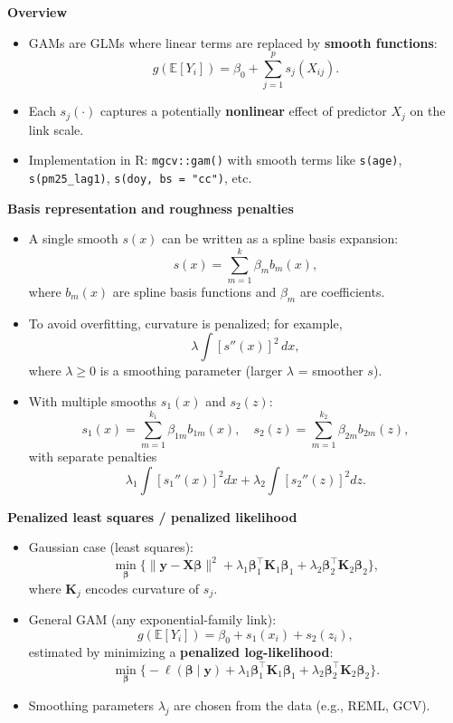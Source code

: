 \documentclass[
  letterpaper,
  DIV=11,
  numbers=noendperiod]{scrreprt}
\providecommand{\tightlist}{%
  \setlength{\itemsep}{0pt}\setlength{\parskip}{0pt}}\usepackage{longtable,booktabs,array}
\begin{document}
\textbf{Overview}

\begin{itemize}
\tightlist
\item
  GAMs are GLMs where linear terms are replaced by \textbf{smooth
  functions}: \[
  g(\mathbb{E}[Y_i]) = \beta_0 + \sum_{j=1}^p s_j(X_{ij}).
  \]
\item
  Each \(s_j(\cdot)\) captures a potentially \textbf{nonlinear} effect
  of predictor \(X_j\) on the link scale.
\item
  Implementation in R: \texttt{mgcv::gam()} with smooth terms like
  \texttt{s(age)}, \texttt{s(pm25\_lag1)},
  \texttt{s(doy,\ bs\ =\ "cc")}, etc.
\end{itemize}

\textbf{Basis representation and roughness penalties}

\begin{itemize}
\item
  A single smooth \(s(x)\) can be written as a spline basis expansion:
  \[
  s(x) = \sum_{m=1}^{k} \beta_m b_m(x),
  \] where \(b_m(x)\) are spline basis functions and \(\beta_m\) are
  coefficients.
\item
  To avoid overfitting, curvature is penalized; for example, \[
  \lambda \int [s''(x)]^2 \, dx,
  \] where \(\lambda \ge 0\) is a smoothing parameter (larger
  \(\lambda\) = smoother \(s\)).
\item
  With multiple smooths \(s_1(x)\) and \(s_2(z)\): \[
  s_1(x) = \sum_{m=1}^{k_1} \beta_{1m} b_{1m}(x), \quad
  s_2(z) = \sum_{m=1}^{k_2} \beta_{2m} b_{2m}(z),
  \] with separate penalties \[
  \lambda_1 \int [s_1''(x)]^2 dx + \lambda_2 \int [s_2''(z)]^2 dz.
  \]
\end{itemize}

\textbf{Penalized least squares / penalized likelihood}

\begin{itemize}
\tightlist
\item
  Gaussian case (least squares): \[
  \min_{\boldsymbol{\beta}}\Big\{
    \|\mathbf{y} - \mathbf{X}\boldsymbol{\beta}\|^2
    + \lambda_1 \boldsymbol{\beta}_1^\top \mathbf{K}_1 \boldsymbol{\beta}_1
    + \lambda_2 \boldsymbol{\beta}_2^\top \mathbf{K}_2 \boldsymbol{\beta}_2
  \Big\},
  \] where \(\mathbf{K}_j\) encodes curvature of \(s_j\).
\item
  General GAM (any exponential-family link): \[
  g(\mathbb{E}[Y_i]) = \beta_0 + s_1(x_i) + s_2(z_i),
  \] estimated by minimizing a \textbf{penalized log-likelihood}: \[
  \min_{\boldsymbol{\beta}}\Big\{
    -\ell(\boldsymbol{\beta}\mid\mathbf{y})
    + \lambda_1 \boldsymbol{\beta}_1^\top \mathbf{K}_1 \boldsymbol{\beta}_1
    + \lambda_2 \boldsymbol{\beta}_2^\top \mathbf{K}_2 \boldsymbol{\beta}_2
  \Big\}.
  \]
\item
  Smoothing parameters \(\lambda_j\) are chosen from the data (e.g.,
  REML, GCV).
\end{itemize}
\end{document}
